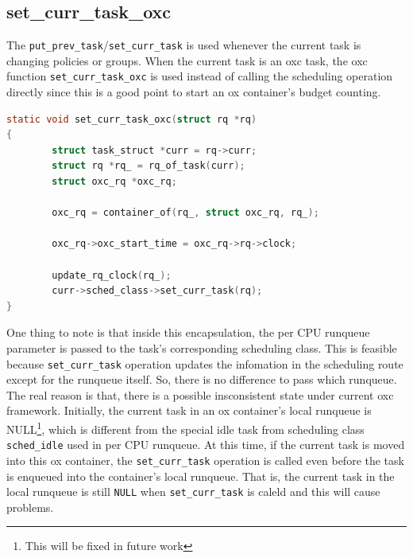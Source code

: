 \subsection{set\_curr\_task\_oxc}
The \texttt{put\_prev\_task}/\texttt{set\_curr\_task} is used whenever
the current task is changing policies or groups.
When the current task is an oxc task, the oxc function 
\texttt{set\_curr\_task\_oxc} is used instead of calling the scheduling
operation directly since this is a good point to start an ox container's
budget counting.
\begin{lstlisting}[language=C,
	caption={Another point to update reservation information}]
static void set_curr_task_oxc(struct rq *rq)
{
        struct task_struct *curr = rq->curr;
        struct rq *rq_ = rq_of_task(curr);
        struct oxc_rq *oxc_rq;

        oxc_rq = container_of(rq_, struct oxc_rq, rq_);

        oxc_rq->oxc_start_time = oxc_rq->rq->clock;

        update_rq_clock(rq_);
        curr->sched_class->set_curr_task(rq);
}
\end{lstlisting}
One thing to note is that inside this encapsulation, the per CPU runqueue
parameter is passed to the task's corresponding scheduling class. This is
feasible because \texttt{set\_curr\_task} operation updates the infomation in the 
scheduling route except for the runqueue itself. So, there is no difference
to pass which runqueue. The real reason is that, there is a possible
insconsistent state under current oxc framework. 
Initially, the current task in an ox container's local runqueue is 
NULL\footnote{This will be fixed in future work}, which is different 
from the special idle task from scheduling class \texttt{sched\_idle} used
in per CPU runqueue. At this time, if the current task is moved into 
this ox container, the \texttt{set\_curr\_task} operation is called 
even before the task is enqueued into the container's local runqueue. 
That is, the current task in the local runqueue is still \texttt{NULL} when
\texttt{set\_curr\_task} is caleld and this will cause problems.

